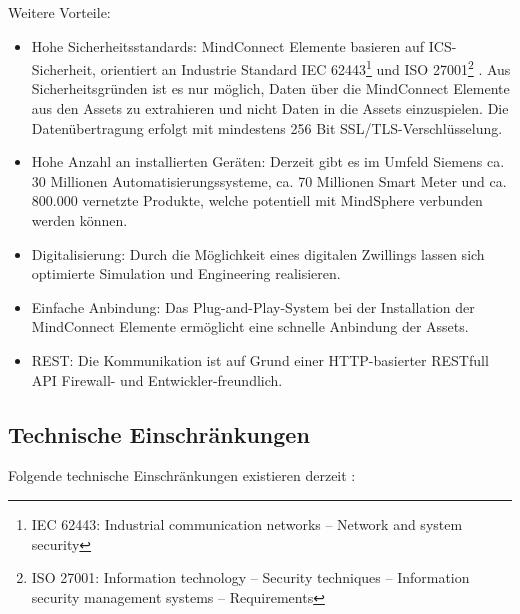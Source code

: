 Weitere Vorteile:
\begin{itemize}
\item Hohe Sicherheitsstandards:
MindConnect Elemente basieren auf \ac{ICS}-Sicherheit, orientiert an Industrie Standard IEC 62443\footnote{IEC 62443: Industrial communication networks – Network and system security} und ISO 27001\footnote{ISO 27001: Information technology – Security techniques – Information security management systems – Requirements} \parencite{SiemensMSMCSecurity}. Aus Sicherheitsgründen ist es nur möglich, Daten über die MindConnect Elemente aus den Assets zu extrahieren und nicht Daten in die Assets einzuspielen. Die Datenübertragung erfolgt mit mindestens 256 Bit SSL/TLS-Verschlüsselung.
\item Hohe Anzahl an installierten Geräten:
Derzeit gibt es im Umfeld Siemens ca. 30 Millionen Automatisierungssysteme, ca. 70 Millionen Smart Meter und ca. 800.000 vernetzte Produkte, welche potentiell mit MindSphere verbunden werden können.
\item Digitalisierung:
Durch die Möglichkeit eines digitalen Zwillings lassen sich optimierte Simulation und Engineering realisieren.
\item Einfache Anbindung:
Das Plug-and-Play-System bei der Installation der MindConnect Elemente ermöglicht eine schnelle Anbindung der Assets. 
\item REST:
Die Kommunikation ist auf Grund einer HTTP-basierter RESTfull API Firewall- und Entwickler-freundlich.  
\end{itemize}

\subsection{Technische Einschränkungen}
Folgende technische Einschränkungen existieren derzeit \parencite{SiemensMSTraining}: 

